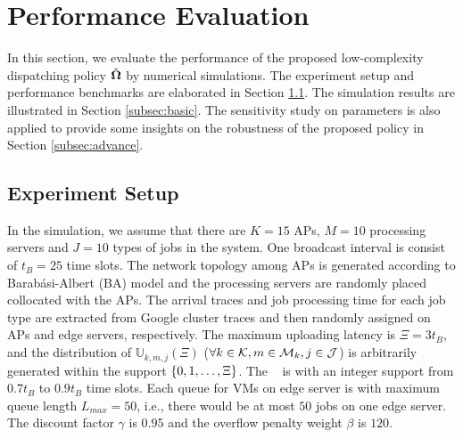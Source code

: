 \section{Performance Evaluation}
\label{sec:evaluation}
In this section, we evaluate the performance of the proposed low-complexity dispatching policy $\tilde{\boldsymbol{\Omega}}$ by numerical simulations.
The experiment setup and performance benchmarks are elaborated in Section \ref{subsec:setup}.
The simulation results are illustrated in Section \ref{subsec:basic}.
The sensitivity study on parameters is also applied to provide some insights on the robustness of the proposed policy in Section \ref{subsec:advance}.

\subsection{Experiment Setup}
\label{subsec:setup}
In the simulation, we assume that there are $K=15$ APs, $M=10$ processing servers and $J=10$ types of jobs in the system.
One broadcast interval is consist of $t_{B}=25$ time slots.
The network topology among APs is generated according to Barab\'asi-Albert (BA) model \cite{albert1999diameter} and the processing servers are randomly placed collocated with the APs.
The arrival traces and job processing time for each job type are extracted from Google cluster traces \cite{clusterdata:Reiss2011} and then randomly assigned on APs and edge servers, respectively.
The maximum uploading latency is $\Xi = 3t_B$, and the distribution of $\mathbb{U}_{k,m,j}(\Xi)$ ($\forall k\in\mathcal{K}, m\in\mathcal{M}_{k}, j\in\mathcal{J}$) is arbitrarily generated within the support $\{0, 1, \dots, \Xi\}$.
The \brlatency~ is with an integer support from $0.7t_B$ to $0.9t_B$ time slots.
Each queue for VMs on edge server is with maximum queue length $L_{max}=50$, i.e., there would be at most $50$ jobs on one edge server.
The discount factor $\gamma$ is $0.95$ and the overflow penalty weight $\beta$ is $120$.


